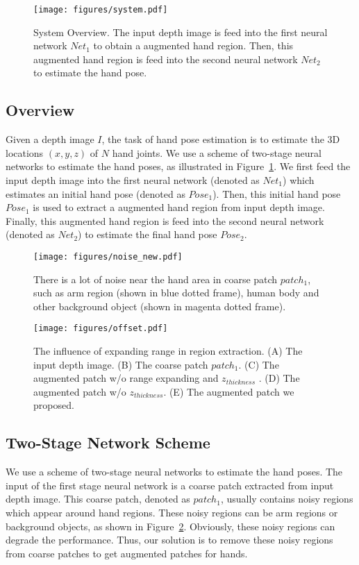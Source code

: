 \documentclass{article}
\begin{document}
\begin{figure}[t]
	\centering
	\texttt{[image: figures/system.pdf]}
	\caption{System Overview. The input depth image is feed into the first neural network $Net_1$ to obtain a augmented hand region. Then, this augmented hand region is feed into the second neural network $Net_2$ to estimate the hand pose.}
	\label{fig:overview} 
\end{figure}
\subsection{Overview}\label{sec:overview}
Given a depth image $I$, the task of hand pose estimation is to estimate the 3D locations $(x,y,z)$ of $N$ hand joints. We use a scheme of two-stage neural networks to estimate the hand poses, as illustrated in Figure~\ref{fig:overview}.
We first feed the input depth image into the first neural network (denoted as $Net_1$) which estimates an initial hand pose (denoted as $Pose_1$). 
Then, this initial hand pose $Pose_1$ is used to extract a augmented hand region from input depth image.
Finally, this augmented hand region is feed into the second neural network (denoted as $Net_2$) to estimate the final hand pose $Pose_2$. 



\begin{figure}[t]
	\centering
	\texttt{[image: figures/noise\_new.pdf]}
	\caption{There is a lot of noise near the hand area in coarse patch $patch_1$, such as arm region (shown in blue dotted frame), human body and other background object (shown in magenta dotted frame).}
	\label{fig:noise} 
\end{figure}


\begin{figure}[t]
	\centering
	\texttt{[image: figures/offset.pdf]}
	\caption{The influence of expanding range in region extraction. (A) The input depth image. (B) The coarse patch $patch_1$. (C) The augmented patch w/o range expanding and $z_{thickness}$ . (D) The augmented patch w/o $z_{thickness}$. (E) The augmented patch we proposed.}
	\label{fig:offset} 
\end{figure}


\subsection{Two-Stage Network Scheme}\label{sec:net}
We use a scheme of two-stage neural networks to estimate the hand poses. The input of the first stage neural network is a coarse patch extracted from input depth image.
This coarse patch, denoted as $patch_1$, usually contains noisy regions which appear around hand regions. These noisy regions can be arm regions or background objects, as shown in Figure~\ref{fig:noise}. Obviously, these noisy regions can degrade the performance. Thus, our solution is to remove these noisy regions from coarse patches to get augmented patches for hands.
\end{document}
